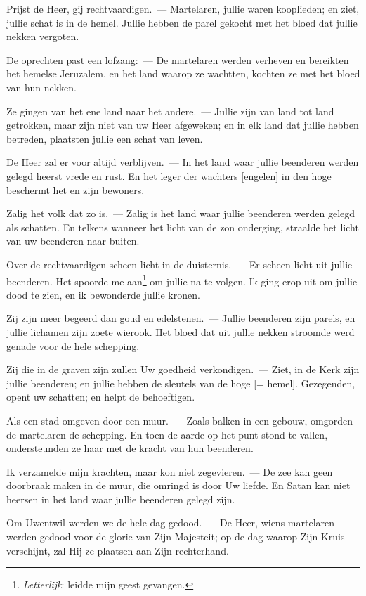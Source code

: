 \documentclass[12pt,twoside,a5paper]{article}
\begin{document}
\begin{halfparskip}
  Prijst de Heer, gij rechtvaardigen.~--- Martelaren, jullie waren kooplieden; en ziet, jullie schat is in de hemel. Jullie hebben de parel gekocht met het bloed dat jullie nekken vergoten.

  De oprechten past een lofzang:~--- De martelaren werden verheven en bereikten het hemelse Jeruzalem, en het land waarop ze wachtten, kochten ze met het bloed van hun nekken.

  Ze gingen van het ene land naar het andere.~--- Jullie zijn van land tot land getrokken, maar zijn niet van uw Heer afgeweken; en in elk land dat jullie hebben betreden, plaatsten jullie een schat van leven.

  De Heer zal er voor altijd verblijven.~--- In het land waar jullie beenderen werden gelegd heerst vrede en rust. En het leger der wachters [engelen] in den hoge beschermt het en zijn bewoners.

  Zalig het volk dat zo is.~--- Zalig is het land waar jullie beenderen werden gelegd als schatten. En telkens wanneer het licht van de zon onderging, straalde het licht van uw beenderen naar buiten.

  Over de rechtvaardigen scheen licht in de duisternis.~--- Er scheen licht uit jullie beenderen. Het spoorde me aan\footnote{\emph{Letterlijk}: leidde mijn geest gevangen.} om jullie na te volgen. Ik ging erop uit om jullie dood te zien, en ik bewonderde jullie kronen.

  Zij zijn meer begeerd dan goud en edelstenen.~--- Jullie beenderen zijn parels, en jullie lichamen zijn zoete wierook. Het bloed dat uit jullie nekken stroomde werd genade voor de hele schepping.

  Zij die in de graven zijn zullen Uw goedheid verkondigen.~--- Ziet, in de Kerk zijn jullie beenderen; en jullie hebben de sleutels van de hoge [= hemel]. Gezegenden, opent uw schatten; en helpt de behoeftigen.

  Als een stad omgeven door een muur.~--- Zoals balken in een gebouw, omgorden de martelaren de schepping. En toen de aarde op het punt stond te vallen, ondersteunden ze haar met de kracht van hun beenderen.

  Ik verzamelde mijn krachten, maar kon niet zegevieren.~--- De zee kan geen doorbraak maken in de muur, die omringd is door Uw liefde. En Satan kan niet heersen in het land waar jullie beenderen gelegd zijn.

  Om Uwentwil werden we de hele dag gedood.~--- De Heer, wiens martelaren werden gedood voor de glorie van Zijn Majesteit; op de dag waarop Zijn Kruis verschijnt, zal Hij ze plaatsen aan Zijn rechterhand.


\end{halfparskip}
\end{document}
